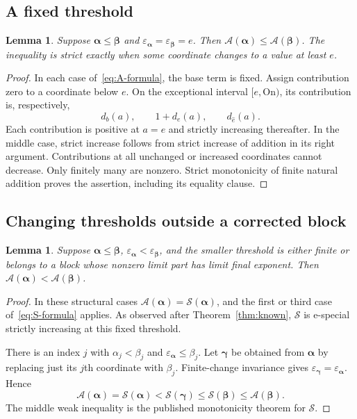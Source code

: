 \documentclass[11pt,letterpaper]{article}
\newtheorem{lemma}[theorem]{Lemma}
\theoremstyle{definition}
\theoremstyle{remark}
\newcommand{\On}{\mathrm{On}}
\newcommand{\Sop}{\mathcal S}
\newcommand{\Aop}{\mathcal A}
\newcommand{\seq}[1]{\boldsymbol{#1}}
\newcommand{\epsa}{\varepsilon_{\seq\alpha}}
\newcommand{\epsb}{\varepsilon_{\seq\beta}}
\newcommand{\diff}[2]{d_{#1}(#2)}
\begin{document}
\subsection{A fixed threshold}

\begin{lemma}\label{lem:fixed}
Suppose $\seq\alpha\le\seq\beta$ and $\epsa=\epsb=e$. Then $\Aop(\seq\alpha)\le\Aop(\seq\beta)$. The inequality is strict exactly when some coordinate changes to a value at least $e$.
\end{lemma}
\begin{proof}
In each case of~\eqref{eq:A-formula}, the base term is fixed. Assign contribution zero to a coordinate below $e$. On the exceptional interval $[e,\On)$, its contribution is, respectively,
\[
 \diff b a,\qquad 1+\diff e a,\qquad \diff{\widehat e}a.
\]
Each contribution is positive at $a=e$ and strictly increasing thereafter. In the middle case, strict increase follows from strict increase of addition in its right argument. Contributions at all unchanged or increased coordinates cannot decrease. Only finitely many are nonzero. Strict monotonicity of finite natural addition proves the assertion, including its equality clause.
\end{proof}

\subsection{Changing thresholds outside a corrected block}

\begin{lemma}\label{lem:ordinary-source}
Suppose $\seq\alpha\le\seq\beta$, $\epsa<\epsb$, and the smaller threshold is either finite or belongs to a block whose nonzero limit part has limit final exponent. Then $\Aop(\seq\alpha)<\Aop(\seq\beta)$.
\end{lemma}
\begin{proof}
In these structural cases $\Aop(\seq\alpha)=\Sop(\seq\alpha)$, and the first or third case of~\eqref{eq:S-formula} applies. As observed after Theorem~\ref{thm:known}, $\Sop$ is e-special strictly increasing at this fixed threshold.

There is an index $j$ with $\alpha_j<\beta_j$ and $\epsa\le\beta_j$. Let $\seq\gamma$ be obtained from $\seq\alpha$ by replacing just its $j$th coordinate with $\beta_j$. Finite-change invariance gives $\varepsilon_{\seq\gamma}=\epsa$. Hence
\[
 \Aop(\seq\alpha)=\Sop(\seq\alpha)<\Sop(\seq\gamma)
       \le\Sop(\seq\beta)\le\Aop(\seq\beta).
\]
The middle weak inequality is the published monotonicity theorem for $\Sop$.
\end{proof}
\end{document}
